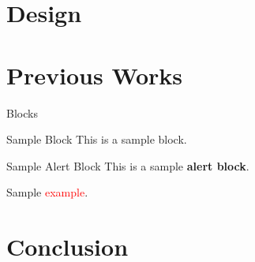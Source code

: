 \documentclass{beamer}
\begin{document}
\section{Design}

\section{Previous Works}
\begin{frame}{Blocks}
    \begin{block}{Sample Block}
    This is a sample block.
    \end{block}
    \begin{alertblock}{Sample Alert Block}
    This is a sample \textbf<2>{alert block}.
    \end{alertblock}
    \begin{example}
    Sample \textcolor<3->{red}{example}.
    \end{example}
\end{frame}
\section{Conclusion}

\end{document}

